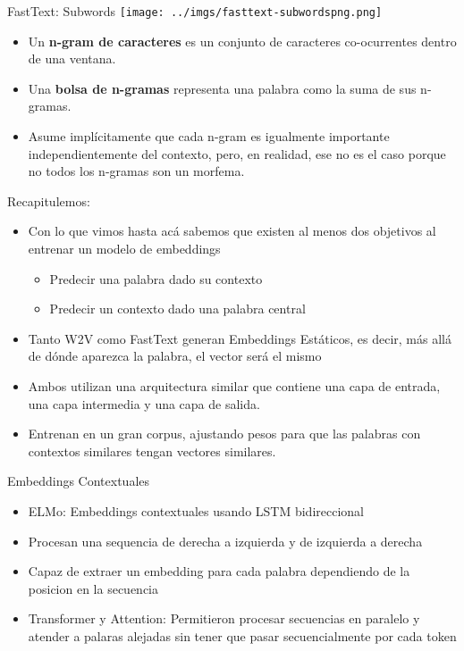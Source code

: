 \documentclass{beamer}
\begin{document}
\begin{frame}{FastText: Subwords}
    \centering
    \texttt{[image: ../imgs/fasttext-subwordspng.png]}
    
    \vspace{1em} %

    {\footnotesize %
    \begin{itemize}
        \item Un \textbf{n-gram de caracteres} es un conjunto de caracteres co-ocurrentes dentro de una ventana.
        \item Una \textbf{bolsa de n-gramas} representa una palabra como la suma de sus n-gramas.
        \item Asume implícitamente que cada n-gram es igualmente importante independientemente del contexto, pero, en realidad, ese no es el caso porque no todos los n-gramas son un morfema.
    \end{itemize}
    }
\end{frame}

\begin{frame}
Recapitulemos: 
\begin{itemize}
\item Con lo que vimos hasta acá sabemos que existen al menos dos objetivos al entrenar un modelo de embeddings 
\begin{itemize}
\item Predecir una palabra dado su contexto
\item Predecir un contexto dado una palabra central
\end{itemize}
\item Tanto W2V como FastText generan Embeddings Estáticos, es decir, más allá de dónde aparezca la palabra, el vector será el mismo
\item Ambos utilizan una arquitectura similar que contiene una capa de entrada, una capa intermedia y una capa de salida. 
\item Entrenan en un gran corpus, ajustando pesos para que las palabras con contextos similares tengan vectores similares.
\end{itemize}

\end{frame}

\begin{frame}{Embeddings Contextuales}
\begin{itemize}
\item ELMo: Embeddings contextuales usando LSTM bidireccional
 \item Procesan una sequencia de derecha a izquierda y de izquierda a derecha
\item Capaz de extraer un embedding para cada palabra dependiendo de la posicion en la secuencia
\item Transformer y Attention: Permitieron procesar secuencias en paralelo y atender a palaras alejadas sin tener que pasar secuencialmente por cada token 
\end{itemize}
\end{frame}
\end{document}
